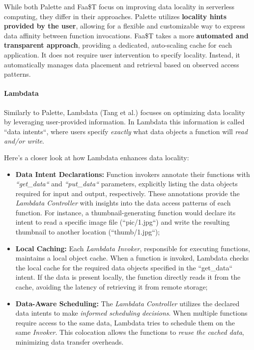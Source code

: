 While both Palette and Faa\$T focus on improving data locality in serverless computing, they differ in their approaches. Palette utilizes \textbf{locality hints provided by the user}, allowing for a flexible and customizable way to express data affinity between function invocations. Faa\$T takes a more \textbf{automated and transparent approach}, providing a dedicated, auto-scaling cache for each application. It does not require user intervention to specify locality. Instead, it automatically manages data placement and retrieval based on observed access patterns.

\paragraph{Lambdata}
Similarly to Palette, Lambdata (Tang et al.\cite{lambdata_intents}) focuses on optimizing data locality by leveraging user-provided information. In Lambdata this information is called ``data intents``, where users specify \textit{exactly} what data objects a function will \textit{read and/or write}.

Here's a closer look at how Lambdata enhances data locality:

\begin{itemize}
\item \textbf{Data Intent Declarations:} Function invokers annotate their functions with \textit{``get\_data``} and \textit{``put\_data``} parameters, explicitly listing the data objects required for input and output, respectively. These annotations provide the \textit{Lambdata Controller} with insights into the data access patterns of each function. For instance, a thumbnail-generating function would declare its intent to read a specific image file (``pic/1.jpg``) and write the resulting thumbnail to another location (``thumb/1.jpg``);
\item \textbf{Local Caching:} Each \textit{Lambdata Invoker}, responsible for executing functions, maintains a local object cache. When a function is invoked, Lambdata checks the local cache for the required data objects specified in the ``get\_data`` intent. If the data is present locally, the function directly reads it from the cache, avoiding the latency of retrieving it from remote storage;
\item \textbf{Data-Aware Scheduling:} The \textit{Lambdata Controller} utilizes the declared data intents to make \textit{informed scheduling decisions}. When multiple functions require access to the same data, Lambdata tries to schedule them on the same \textit{Invoker}. This colocation allows the functions to \textit{reuse the cached data}, minimizing data transfer overheads.
\end{itemize}

